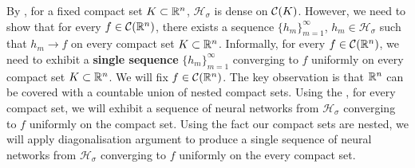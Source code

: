 \begin{proof-idea*}
By , for a fixed compact set $K \subset {\mathbb R}^n$, $\mathcal{H}_{\sigma}$ is dense on ${\mathcal C}(K)$.
However, we need to show that for every $f \in {\mathcal C}({\mathbb R}^n)$, there exists a sequence $\{ h_m \}_{m=1}^\infty$, $h_m \in \mathcal{H}_{\sigma}$ such that $h_m \to f$ on every compact set $K \subset {\mathbb R}^n$. Informally, for every $f \in {\mathcal C}({\mathbb R}^n)$, we need to exhibit a \textbf{single sequence } $\{ h_m \}_{m=1}^\infty$ converging to $f$ uniformly on every compact set $K \subset {\mathbb R}^n$. We will fix $f \in {\mathcal C}({\mathbb R}^n)$. The key observation is that ${\mathbb R}^n$ can be covered with a countable union of nested compact sets. Using the , for every compact set, we will exhibit a sequence of neural networks from  $\mathcal{H}_{\sigma}$ converging to $f$ uniformly on the compact set. Using the fact our compact sets are nested, we will apply diagonalisation argument to produce a single sequence of neural networks from  $\mathcal{H}_{\sigma}$ converging to $f$ uniformly on the every compact set.
\end{proof-idea*}

